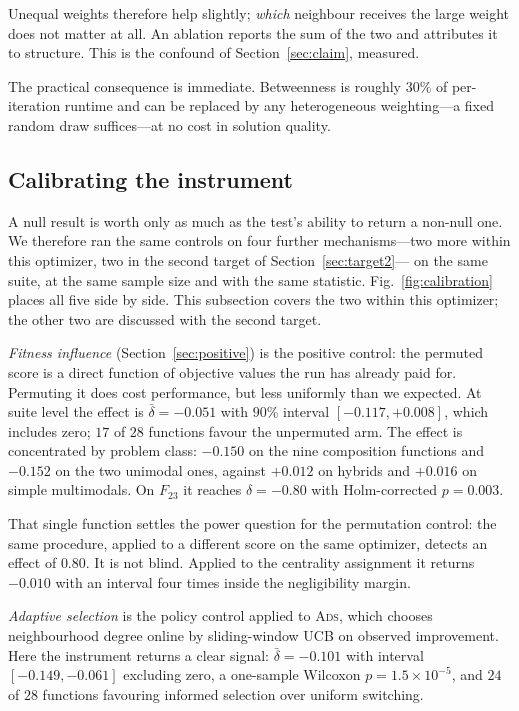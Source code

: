 Unequal weights therefore help slightly; \emph{which} neighbour receives the
large weight does not matter at all. An ablation reports the sum of the two and
attributes it to structure. This is the confound of Section~\ref{sec:claim},
measured.

The practical consequence is immediate. Betweenness is roughly $30\%$ of
per-iteration runtime and can be replaced by any heterogeneous weighting---a
fixed random draw suffices---at no cost in solution quality.

\subsection{Calibrating the instrument}
\label{sec:res:calibration}

A null result is worth only as much as the test's ability to return a non-null
one. We therefore ran the same controls on four further mechanisms---two more
within this optimizer, two in the second target of Section~\ref{sec:target2}---%
on the same suite, at the same sample size and with the same statistic.
Fig.~\ref{fig:calibration} places all five side by side. This subsection covers
the two within this optimizer; the other two are discussed with the second
target.

\emph{Fitness influence} (Section~\ref{sec:positive}) is the positive control:
the permuted score is a direct function of objective values the run has already
paid for. Permuting it does cost performance, but less uniformly than we
expected. At suite level the effect is $\bar{\delta}=-0.051$ with $90\%$
interval $[-0.117,+0.008]$, which includes zero; $17$ of $28$ functions favour
the unpermuted arm. The effect is concentrated by problem class: $-0.150$ on
the nine composition functions and $-0.152$ on the two unimodal ones, against
$+0.012$ on hybrids and $+0.016$ on simple multimodals. On $F_{23}$ it reaches
$\delta=-0.80$ with Holm-corrected $p=0.003$.

That single function settles the power question for the permutation control:
the same procedure, applied to a different score on the same optimizer, detects
an effect of $0.80$. It is not blind. Applied to the centrality assignment it
returns $-0.010$ with an interval four times inside the negligibility margin.

\emph{Adaptive selection} is the policy control applied to \textsc{Ads}, which
chooses neighbourhood degree online by sliding-window UCB on observed
improvement. Here the instrument returns a clear signal: $\bar{\delta}=-0.101$
with interval $[-0.149,-0.061]$ excluding zero, a one-sample Wilcoxon
$p=1.5\times10^{-5}$, and $24$ of $28$ functions favouring informed selection
over uniform switching.

